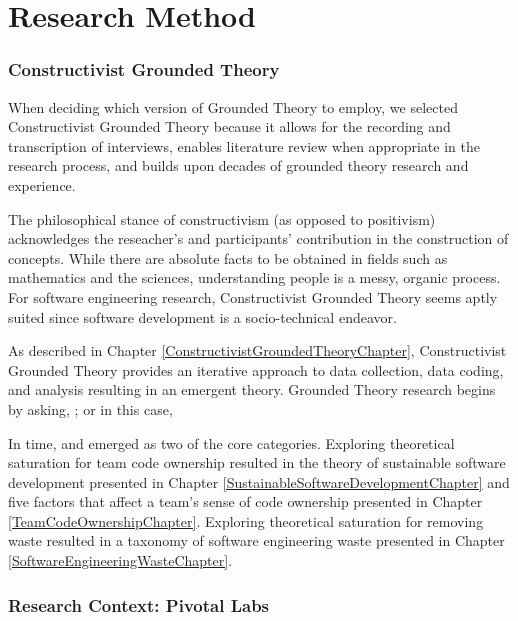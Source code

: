 
\chapter{Research Method}
\label{ResearchMethodChapter}
\label{ResearchMethod}


\subsection{Constructivist Grounded Theory}

When deciding which version of Grounded Theory to employ, we selected Constructivist Grounded Theory \cite{Charmaz} because it allows for the recording and transcription of interviews, enables literature review when appropriate in the research process, and builds upon decades of grounded theory research and experience.

The philosophical stance of constructivism (as opposed to positivism) acknowledges the reseacher's and participants' contribution in the construction of concepts. 
While there are absolute facts to be obtained in fields such as mathematics and the sciences, understanding people is a messy, organic process. For software engineering research, Constructivist Grounded Theory seems aptly suited since software development is a socio-technical endeavor.

As described in Chapter \ref{ConstructivistGroundedTheoryChapter}, Constructivist Grounded Theory provides an iterative approach to data collection, data coding, and analysis resulting in an emergent theory. Grounded Theory research begins by asking,  \cite{GlaserTheoreticalSensitivity}; or in this case,  

In time,  and  emerged as two of the core categories. Exploring theoretical saturation for team code ownership resulted in the theory of sustainable software development presented in Chapter \ref{SustainableSoftwareDevelopmentChapter} and five factors that affect a team's sense of code ownership presented in Chapter \ref{TeamCodeOwnershipChapter}. Exploring theoretical saturation for removing waste resulted in a taxonomy of software  engineering waste presented in Chapter \ref{SoftwareEngineeringWasteChapter}.

\subsection{Research Context: Pivotal Labs}
\label{SustainableSoftwareDevelopmentResearchContext}


